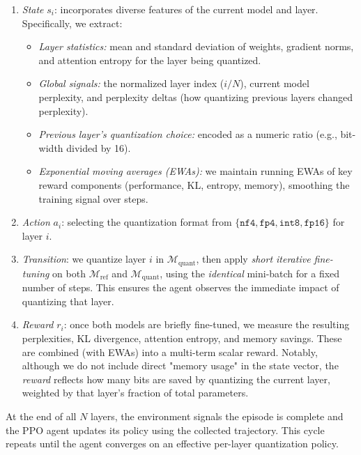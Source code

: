 \documentclass{article}
\begin{document}
	\begin{enumerate}
		\item \textit{State} $s_i$: incorporates diverse features of the current model and layer. Specifically, we extract:
		\begin{itemize}
			\item \emph{Layer statistics:} mean and standard deviation of weights, gradient norms, and attention entropy for the layer being quantized.
			\item \emph{Global signals:} the normalized layer index ($i/N$), current model perplexity, and perplexity deltas (how quantizing previous layers changed perplexity).
			\item \emph{Previous layer's quantization choice:} encoded as a numeric ratio (e.g., bit-width divided by 16).
			\item \emph{Exponential moving averages (EWAs):} we maintain running EWAs of key reward components (performance, KL, entropy, memory), smoothing the training signal over steps.
		\end{itemize}
		
		\item \textit{Action} $a_i$: selecting the quantization format from $\{\texttt{nf4}, \texttt{fp4}, \texttt{int8}, \texttt{fp16}\}$ for layer $i$.
		
		\item \textit{Transition}: we quantize layer $i$ in $\mathcal{M}_{\text{quant}}$, then apply \emph{short iterative fine-tuning} on both $\mathcal{M}_{\text{ref}}$ and $\mathcal{M}_{\text{quant}}$, using the \emph{identical} mini-batch for a fixed number of steps. This ensures the agent observes the immediate impact of quantizing that layer.
		
		\item \textit{Reward} $r_i$: once both models are briefly fine-tuned, we measure the resulting perplexities, KL divergence, attention entropy, and memory savings. These are combined (with EWAs) into a multi-term scalar reward. Notably, although we do not include direct "memory usage" in the state vector, the \emph{reward} reflects how many bits are saved by quantizing the current layer, weighted by that layer's fraction of total parameters.
	\end{enumerate}
	
	At the end of all $N$ layers, the environment signals the episode is complete and the PPO agent updates its policy using the collected trajectory. This cycle repeats until the agent converges on an effective per-layer quantization policy.
	
\end{document}
